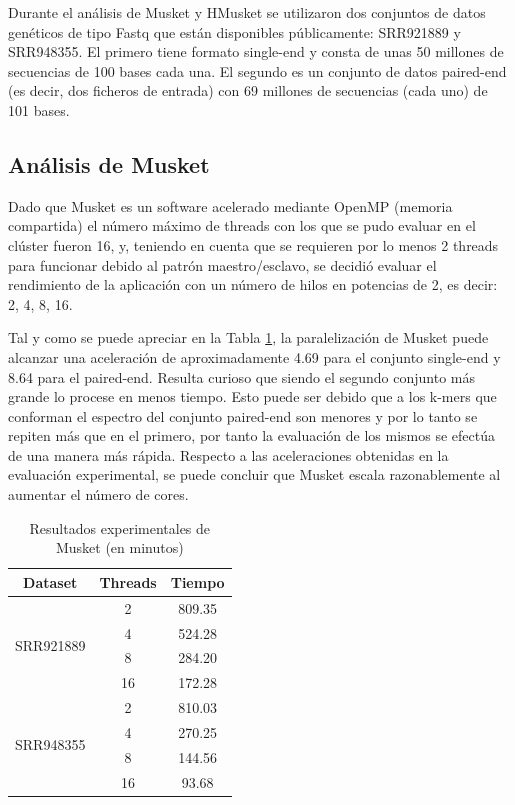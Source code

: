 \documentclass[conference]{IEEEtran}
\begin{document}
Durante el análisis de Musket y HMusket se utilizaron dos conjuntos de datos genéticos de tipo Fastq que están disponibles públicamente: SRR921889 y SRR948355. El primero tiene formato single-end y consta de unas 50 millones de secuencias de 100 bases cada una. El segundo es un conjunto de datos paired-end (es decir, dos ficheros de entrada) con 69 millones de secuencias (cada uno) de 101 bases.


\subsection{Análisis de Musket}
Dado que Musket es un software acelerado mediante OpenMP (memoria compartida) el número máximo de threads con los que se pudo evaluar en el clúster fueron 16, y, teniendo en cuenta que se requieren por lo menos 2 threads para funcionar debido al patrón maestro/esclavo, se decidió evaluar el rendimiento de la aplicación con un número de hilos en potencias de 2, es decir: 2, 4, 8, 16.

Tal y como se puede apreciar en la Tabla \ref{musket_experiment_result}, la paralelización de Musket puede alcanzar una aceleración de aproximadamente 4.69 para el conjunto single-end y 8.64 para el paired-end. Resulta curioso que siendo el segundo conjunto más grande lo procese en menos tiempo. Esto puede ser debido que a los k-mers que conforman el espectro del conjunto paired-end son menores y por lo tanto se repiten más que en el primero, por tanto la evaluación de los mismos se efectúa de una manera más rápida. Respecto a las aceleraciones obtenidas en la evaluación experimental, se puede concluir que Musket escala razonablemente al aumentar el número de cores.

\begin{table}[t]
	\centering
	\caption{Resultados experimentales de Musket (en minutos)}
	\begin{tabular}{|c|c|c|}
		\hline
		\textbf{Dataset} 				& \textbf{Threads} 		& \textbf{Tiempo} \\ \hline
		\multirow{ 4}{*}{SRR921889} 	& 2			    		& 809.35 	\\ \cline{2-3}
							 			& 4		          		& 524.28	\\ \cline{2-3}
							 			& 8		          		& 284.20 	\\ \cline{2-3}
							 			& 16	           		& 172.28 	\\ \hline \hline
		\multirow{ 4}{*}{SRR948355} 	& 2		         		& 810.03	\\ \cline{2-3}
				 						& 4			           	& 270.25	\\ \cline{2-3}
				 						& 8			          	& 144.56 	\\ \cline{2-3}
				 						& 16	          		& 93.68 	\\ \hline
	\end{tabular}
	\label{musket_experiment_result}
\end{table}
\end{document}
